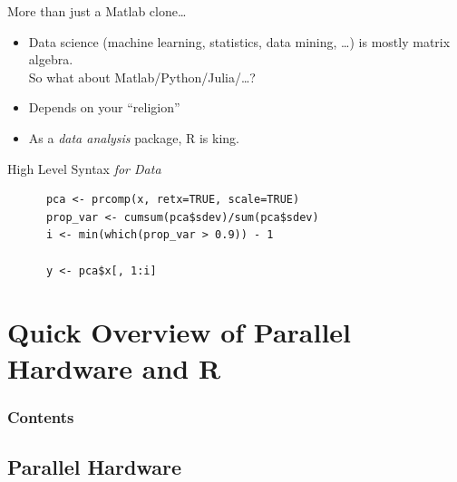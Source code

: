\begin{frame}
  \begin{block}{More than just a Matlab clone\dots}\pause
    \begin{itemize}[<+-|alert@+>]
    \item Data science (machine learning, statistics, data mining,
      \dots) is mostly matrix algebra.  \\[.2cm]
      So what about Matlab/Python/Julia/\dots ?
    \item Depends on your ``religion'' 
    \item As a \emph{data analysis} package, R is king.
    \end{itemize}
  \end{block}
\end{frame}

\begin{frame}[fragile]
  \begin{block}{High Level Syntax \emph{for Data}}\pause
    \begin{lstlisting}
      pca <- prcomp(x, retx=TRUE, scale=TRUE) 
      prop_var <- cumsum(pca$sdev)/sum(pca$sdev) 
      i <- min(which(prop_var > 0.9)) - 1
      
      y <- pca$x[, 1:i]
    \end{lstlisting}  %
  \end{block}
\end{frame}


\section[Parallel Hardware and R]{Quick Overview of Parallel Hardware and R}

\hidenum
\begin{frame}[noframenumbering]
  \frametitle{Contents}
\end{frame}
\shownum


\subsection{Parallel Hardware}

